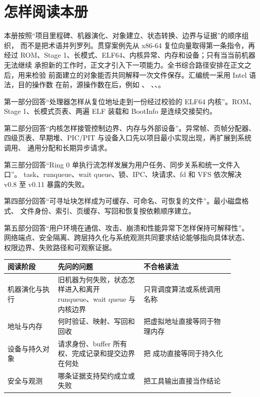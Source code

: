 \chapter*{怎样阅读本册}

本册按照“项目里程碑、机器演化、对象建立、状态转换、边界与证据”的顺序组织，
而不是把术语并列罗列。贯穿案例先从 x86-64 复位向量取得第一条指令，再经过
ROM、Stage 1、长模式、ELF64、内核异常、内存和设备；只有当当前机器无法继续
承担新的工作时，正文才引入下一项能力。全书综合路径安排在正文之后，用来检验
前面建立的对象能否共同解释一次文件保存。汇编统一采用 Intel 语法，目的操作数
在前，源操作数在后，例如 、
、、。

第一部分回答“处理器怎样从复位地址走到一份经过校验的 ELF64 内核”。ROM、
Stage 1、长模式页表、两遍 ELF 装载和 BootInfo 是连续交接契约。

第二部分回答“内核怎样接管控制边界、内存与外部设备”。异常帧、页帧分配器、
四级页表、早期堆、PIC/PIT 与设备入口先以项目最小实现出现，再扩展到系统调用、
通用分配和长期异步请求。

第三部分回答“Ring 0 单执行流怎样发展为用户任务、同步关系和统一文件入口”。
task、runqueue、wait queue、锁、IPC、块请求、fd 和 VFS 依次解决 v0.8 至
v0.11 暴露的失败。

第四部分回答“可寻址块怎样成为可缓存、可命名、可恢复的文件”。最小磁盘格式、
文件身份、索引、页缓存、写回和恢复按依赖顺序建立。

第五部分回答“用户环境在通信、攻击、崩溃和性能异常下怎样保持可解释性”。
网络端点、安全隔离、跨层持久化与系统观测共同要求结论能够指向具体状态、
权限边界、失败路径和可观察证据。

\begin{longtable}{|L{0.2\linewidth}|L{0.34\linewidth}|L{0.36\linewidth}|}
\toprule
阅读阶段 & 先问的问题 & 不合格读法 \\
\midrule
机器演化与执行 & 旧机器为何失败，状态怎样进入和离开 runqueue、wait queue 与内核边界 & 只背调度算法或系统调用名称 \\\tablerowrule
地址与内存 & 何时验证、映射、写回和回收 & 把虚拟地址直接等同于物理内存 \\\tablerowrule
设备与持久对象 & 请求身份、buffer 所有权、完成记录和提交边界在何处 & 把  成功直接等同于持久化 \\\tablerowrule
安全与观测 & 哪条证据支持契约成立或失败 & 把工具输出直接当作结论 \\
\bottomrule
\end{longtable}

